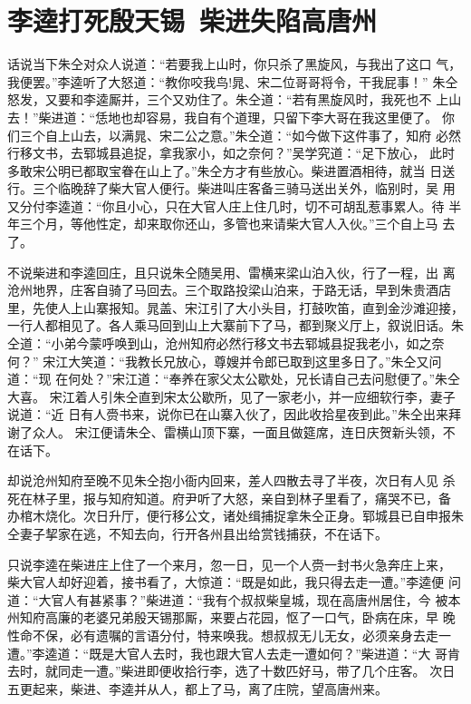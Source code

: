 \chapter{李逵打死殷天锡~柴进失陷高唐州}

话说当下朱仝对众人说道：“若要我上山时，你只杀了黑旋风，与我出了这口
气，我便罢。”李逵听了大怒道：“教你咬我鸟!晁、宋二位哥哥将令，干我屁事！”
朱仝怒发，又要和李逵厮并，三个又劝住了。朱仝道：“若有黑旋风时，我死也不
上山去！”柴进道：“恁地也却容易，我自有个道理，只留下李大哥在我这里便了。
你们三个自上山去，以满晁、宋二公之意。”朱仝道：“如今做下这件事了，知府
必然行移文书，去郓城县追捉，拿我家小，如之奈何？”吴学究道：“足下放心，
此时多敢宋公明已都取宝眷在山上了。”朱仝方才有些放心。柴进置酒相待，就当
日送行。三个临晚辞了柴大官人便行。柴进叫庄客备三骑马送出关外，临别时，吴
用又分付李逵道：“你且小心，只在大官人庄上住几时，切不可胡乱惹事累人。待
半年三个月，等他性定，却来取你还山，多管也来请柴大官人入伙。”三个自上马
去了。

不说柴进和李逵回庄，且只说朱仝随吴用、雷横来梁山泊入伙，行了一程，出
离沧州地界，庄客自骑了马回去。三个取路投梁山泊来，于路无话，早到朱贵酒店
里，先使人上山寨报知。晁盖、宋江引了大小头目，打鼓吹笛，直到金沙滩迎接，
一行人都相见了。各人乘马回到山上大寨前下了马，都到聚义厅上，叙说旧话。朱
仝道：“小弟今蒙呼唤到山，沧州知府必然行移文书去郓城县捉我老小，如之奈何？”
宋江大笑道：“我教长兄放心，尊嫂并令郎已取到这里多日了。”朱仝又问道：“现
在何处？”宋江道：“奉养在家父太公歇处，兄长请自己去问慰便了。”朱仝大喜。
宋江着人引朱仝直到宋太公歇所，见了一家老小，并一应细软行李，妻子说道：“近
日有人赍书来，说你已在山寨入伙了，因此收拾星夜到此。”朱仝出来拜谢了众人。
宋江便请朱仝、雷横山顶下寨，一面且做筵席，连日庆贺新头领，不在话下。

却说沧州知府至晚不见朱仝抱小衙内回来，差人四散去寻了半夜，次日有人见
杀死在林子里，报与知府知道。府尹听了大怒，亲自到林子里看了，痛哭不已，备
办棺木烧化。次日升厅，便行移公文，诸处缉捕捉拿朱仝正身。郓城县已自申报朱
仝妻子挈家在逃，不知去向，行开各州县出给赏钱捕获，不在话下。

只说李逵在柴进庄上住了一个来月，忽一日，见一个人赍一封书火急奔庄上来，
柴大官人却好迎着，接书看了，大惊道：“既是如此，我只得去走一遭。”李逵便
问道：“大官人有甚紧事？”柴进道：“我有个叔叔柴皇城，现在高唐州居住，今
被本州知府高廉的老婆兄弟殷天锡那厮，来要占花园，怄了一口气，卧病在床，早
晚性命不保，必有遗嘱的言语分付，特来唤我。想叔叔无儿无女，必须亲身去走一
遭。”李逵道：“既是大官人去时，我也跟大官人去走一遭如何？”柴进道：“大
哥肯去时，就同走一遭。”柴进即便收拾行李，选了十数匹好马，带了几个庄客。
次日五更起来，柴进、李逵并从人，都上了马，离了庄院，望高唐州来。

